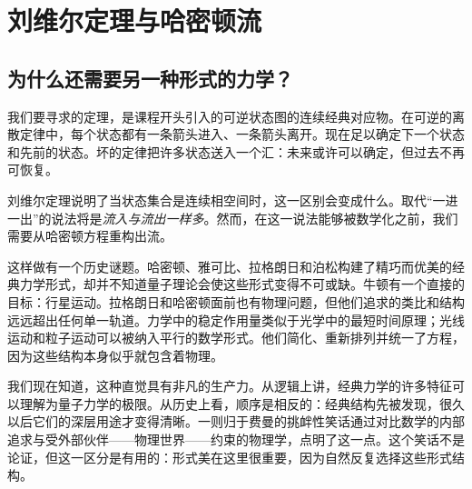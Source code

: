 \chapter{刘维尔定理与哈密顿流}


\section{为什么还需要另一种形式的力学？}

我们要寻求的定理，是课程开头引入的可逆状态图的连续经典对应物。在可逆的离散定律中，每个状态都有一条箭头进入、一条箭头离开。现在足以确定下一个状态和先前的状态。坏的定律把许多状态送入一个汇：未来或许可以确定，但过去不再可恢复。

刘维尔定理说明了当状态集合是连续相空间时，这一区别会变成什么。取代“一进一出”的说法将是\emph{流入与流出一样多}。然而，在这一说法能够被数学化之前，我们需要从哈密顿方程重构出流。

这样做有一个历史谜题。哈密顿、雅可比、拉格朗日和泊松构建了精巧而优美的经典力学形式，却并不知道量子理论会使这些形式变得不可或缺。牛顿有一个直接的目标：行星运动。拉格朗日和哈密顿面前也有物理问题，但他们追求的类比和结构远远超出任何单一轨道。力学中的稳定作用量类似于光学中的最短时间原理；光线运动和粒子运动可以被纳入平行的数学形式。他们简化、重新排列并统一了方程，因为这些结构本身似乎就包含着物理。

我们现在知道，这种直觉具有非凡的生产力。从逻辑上讲，经典力学的许多特征可以理解为量子力学的极限。从历史上看，顺序是相反的：经典结构先被发现，很久以后它们的深层用途才变得清晰。一则归于费曼的挑衅性笑话通过对比数学的内部追求与受外部伙伴——物理世界——约束的物理学，点明了这一点。这个笑话不是论证，但这一区分是有用的：形式美在这里很重要，因为自然反复选择这些形式结构。

\begin{classroomqa}
\end{classroomqa}

